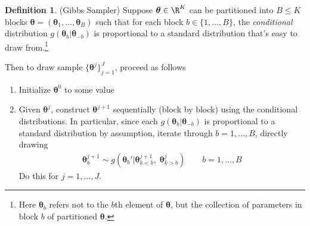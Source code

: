 \documentclass[12pt]{article}
\theoremstyle{plain}
\theoremstyle{definition}
\newtheorem{defn}[thm]{Definition}
\theoremstyle{remark}
\newcommand{\bstheta}{\boldsymbol{\theta}}
\begin{document}
\begin{defn}(Gibbs Sampler)
Suppose $\bstheta\in\R^K$ can be partitioned into $B\leq K$
blocks $\bstheta=(\bstheta_1,\ldots,\bstheta_B)$ such that for each
block $b\in\{1,\ldots,B\}$, the \emph{conditional} distribution
$g(\bstheta_b|\bstheta_{-b})$
is proportional to a standard distribution that's easy to draw
from.\footnote{%
  Here $\bstheta_b$ refers not to the $b$th element of $\bstheta$, but
  the collection of parameters in block $b$ of partitioned $\bstheta$.
}

Then to draw sample $\{\bstheta^j\}_{j=1}^J$,
proceed as follows
\begin{enumerate}
  \item Initialize $\bstheta^0$ to some value
  \item Given $\bstheta^j$, construct $\bstheta^{j+1}$ sequentially
    (block by block) using the conditional distributions.  In
    particular, since each $g(\bstheta_b|\bstheta_{-b})$ is
    proportional to a standard distribution by assumption, iterate
    through $b=1,\ldots,B$, directly drawing
    \begin{align*}
      \bstheta_b^{j+1}
      \sim g(\bstheta_b'|\bstheta^{j+1}_{k<b},\;\bstheta^j_{k>b})
      \qquad
      b = 1,\ldots,B
    \end{align*}
    Do this for $j=1,\ldots,J$.
\end{enumerate}


\end{defn}
\end{document}
